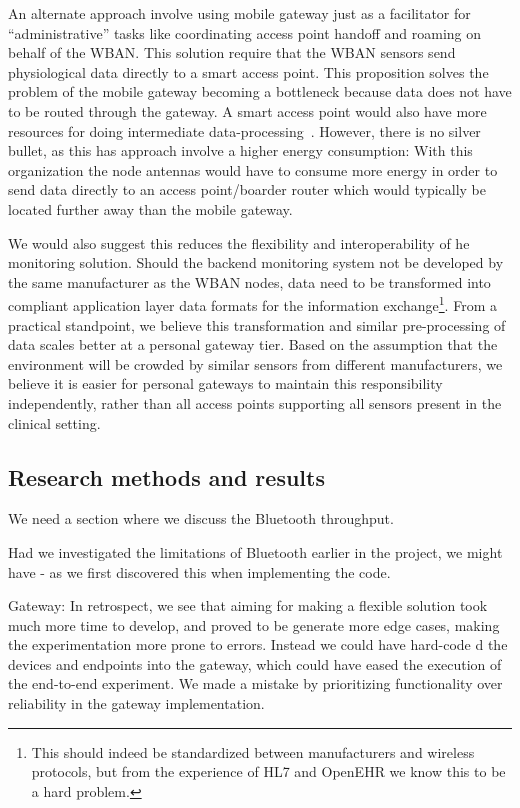 An alternate approach involve using mobile gateway just as a facilitator for ``administrative'' tasks like coordinating access point handoff and roaming on behalf of the WBAN. This solution require that the WBAN sensors send physiological data directly to a smart access point. This proposition solves the problem of the mobile gateway becoming a bottleneck because data does not have to be routed through the gateway. A smart access point would also have more resources for doing intermediate data-processing~\cite{DrAmirMohammadRahmani:2014vx}. However, there is no silver bullet, as this has approach involve a higher energy consumption: With this organization the node antennas would have to consume more energy in order to send data directly to an access point/boarder router which would typically be located further away than the mobile gateway. 

We would also suggest this reduces the flexibility and interoperability of he monitoring solution. Should the backend monitoring system not be developed by the same manufacturer as the WBAN nodes, data need to be transformed into compliant application layer data formats for the information exchange\footnote{ This should indeed be standardized between manufacturers and wireless protocols, but from the experience of HL7 and OpenEHR we know this to be a hard problem.}. From a practical standpoint, we believe this transformation and similar pre-processing of data scales better at a personal gateway tier. Based on the assumption that the environment will be crowded by similar sensors from different manufacturers, we believe it is easier for personal gateways to maintain this responsibility independently, rather than all access points supporting all sensors present in the clinical setting.


\subsection{Research methods and results} %
\label{ssub:research_methods_and_results}

We need a section where we discuss the Bluetooth throughput.

Had we investigated the limitations of Bluetooth earlier in the project, we might have - as we first discovered this when implementing the code.

Gateway: In retrospect, we see that aiming for making a flexible solution took much more time to develop, and proved to be generate more edge cases, making the experimentation more prone to errors. Instead we could have hard-code   d the devices and endpoints into the gateway, which could have eased the execution of the end-to-end experiment. We made a mistake by prioritizing functionality over reliability in the gateway implementation.


